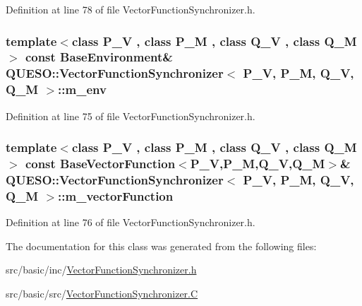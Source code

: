 Definition at line 78 of file Vector\-Function\-Synchronizer.\-h.

\hypertarget{class_q_u_e_s_o_1_1_vector_function_synchronizer_a36c2a9e1a2d317dddb5cf51b68e5c659}{
\subsubsection[{m\-\_\-env}]{\setlength{\rightskip}{0pt plus 5cm}template$<$class P\-\_\-\-V , class P\-\_\-\-M , class Q\-\_\-\-V , class Q\-\_\-\-M $>$ const {\bf Base\-Environment}\& {\bf Q\-U\-E\-S\-O\-::\-Vector\-Function\-Synchronizer}$<$ P\-\_\-\-V, P\-\_\-\-M, Q\-\_\-\-V, Q\-\_\-\-M $>$\-::m\-\_\-env\hspace{0.3cm}{\ttfamily [private]}}}\label{class_q_u_e_s_o_1_1_vector_function_synchronizer_a36c2a9e1a2d317dddb5cf51b68e5c659}


Definition at line 75 of file Vector\-Function\-Synchronizer.\-h.

\hypertarget{class_q_u_e_s_o_1_1_vector_function_synchronizer_abde0efa4a6ab11898d8b0b0853d0971a}{
\subsubsection[{m\-\_\-vector\-Function}]{\setlength{\rightskip}{0pt plus 5cm}template$<$class P\-\_\-\-V , class P\-\_\-\-M , class Q\-\_\-\-V , class Q\-\_\-\-M $>$ const {\bf Base\-Vector\-Function}$<$P\-\_\-\-V,P\-\_\-\-M,Q\-\_\-\-V,Q\-\_\-\-M$>$\& {\bf Q\-U\-E\-S\-O\-::\-Vector\-Function\-Synchronizer}$<$ P\-\_\-\-V, P\-\_\-\-M, Q\-\_\-\-V, Q\-\_\-\-M $>$\-::m\-\_\-vector\-Function\hspace{0.3cm}{\ttfamily [private]}}}\label{class_q_u_e_s_o_1_1_vector_function_synchronizer_abde0efa4a6ab11898d8b0b0853d0971a}


Definition at line 76 of file Vector\-Function\-Synchronizer.\-h.



The documentation for this class was generated from the following files\-:\begin{DoxyCompactItemize}
\item 
src/basic/inc/\hyperlink{_vector_function_synchronizer_8h}{Vector\-Function\-Synchronizer.\-h}\item 
src/basic/src/\hyperlink{_vector_function_synchronizer_8_c}{Vector\-Function\-Synchronizer.\-C}\end{DoxyCompactItemize}
